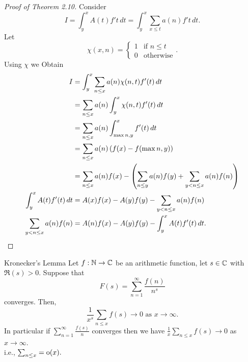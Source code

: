 \documentclass[twoside, openright, fontsize=10pt, headings=big]{scrbook}
\begin{document}
\begin{proof}[Proof of Theorem 2.10]
    Consider 
    \[
        I=\int_{y}^{x}A(t)f't\,dt=\int_{y}^{x}\sum_{x\leq t}a(n)f't\,dt.
    \]
    Let 
    \[
        \chi(x,n)=\begin{cases}
            1&\text{if } n\leq t\\
            0&\text{otherwise}
        \end{cases}.
    \]
    Using $\chi$ we Obtain
    \begin{align*}
        I&=\int_{y}^{x}\sum_{n\leq x}a(n)\chi(n,t)f'(t)\,dt\\
        &=\sum_{n\leq x}a(n)\int_{y}^{x}\chi(n,t)f'(t)\,dt\\
        &=\sum_{n\leq x}a(n)\int_{\max{n,y}}^{x}f'(t)\,dt\\
        &=\sum_{n\leq x}a(n)\left(f(x)-f(\max{n,y})\right)\\
        &=\sum_{n\leq x}a(n)f(x)-\left(\sum_{n\leq y}a(n)f(y)+\sum_{y<n\leq x}a(n)f(n)\right)\\
        \int_{y}^{x}A(t)f'(t)\,dt&=A(x)f(x)-A(y)f(y)-\sum_{y<n\leq x}a(n)f(n)\\
        \sum_{y<n\leq x}a(n)f(n)&=A(n)f(x)-A(y)f(y)-\int_{y}^{x}A(t)f'(t)\,dt.\qedhere
    \end{align*}
\end{proof}
\begin{theorem}{Kronecker's Lemma}{}
    Let $f:\mathbb{N}\to\mathbb{C}$ be an arithmetic function, let $s\in\mathbb{C}$ with $\Re(s)>0$. Suppose that
    \[
        F(s)=\sum_{n=1}^{\infty}\frac{f(n)}{n^s}
    \]
    converges. Then, 
    \[
        \frac{1}{x^s}\sum_{n\leq x}f(s)\to0\text{ as } x\to\infty.
    \]
    In particular if $\sum_{n=1}^{\infty}\frac{f(s)}{n}$ converges then we have $\frac{1}{x}\sum_{n\leq x}f(s)\to 0$ as $x\to\infty$.\\
    i.e., $\sum_{n\leq x}=\text{o}(x).$
\end{theorem}
\end{document}
